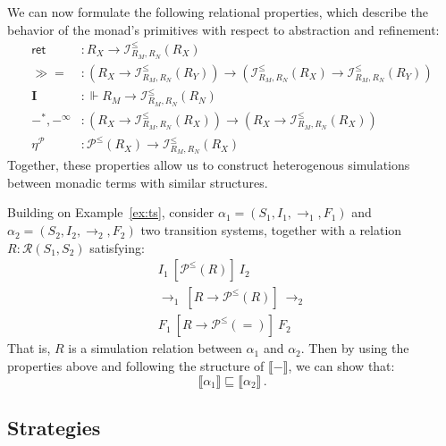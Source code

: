 \documentclass[acmsmall,timestamp,review,anonymous]{acmart}
\newcommand{\kw}[1]{\ensuremath{ \mathsf{#1} }}
\newcommand{\ifr}[1]{\ [{#1}]\ }
\newcommand{\bind}{\gg\!\!=}
\begin{document}
We can now formulate the following relational properties,
which describe the behavior of the monad's primitives
with respect to abstraction and refinement:
\begin{align*}
  \kw{ret} &:
    R_X \rightarrow \mathcal{I}^\le_{R_M,R_N}(R_X) \\
  \bind &:
    (R_X \rightarrow
     \mathcal{I}^\le_{R_M,R_N}(R_Y)) \rightarrow
    (\mathcal{I}^\le_{R_M,R_N}(R_X) \rightarrow
     \mathcal{I}^\le_{R_M,R_N}(R_Y)) \\
  \mathbf{I} &:
    {}\Vdash R_M \rightarrow
    \mathcal{I}^\le_{R_M,R_N}(R_N) \\
  -^*,
  -^\infty &:
    (R_X \rightarrow \mathcal{I}^\le_{R_M,R_N}(R_X)) \rightarrow
    (R_X \rightarrow \mathcal{I}^\le_{R_M,R_N}(R_X)) \\
  \eta^\mathcal{P} &:
    \mathcal{P}^\le(R_X) \rightarrow
    \mathcal{I}^\le_{R_M,R_N}(R_X)
\end{align*}
Together,
these properties allow us to construct
heterogenous simulations
between monadic terms with similar structures.

\begin{example} \label{ex:sim}
Building on Example~\ref{ex:ts},
consider
$\alpha_1 = (S_1, I_1, {\rightarrow}_1, F_1)$ and
$\alpha_2 = (S_2, I_2, {\rightarrow}_2, F_2)$
two transition systems,
together with a relation
$R : \mathcal{R}(S_1, S_2)$
satisfying:
\begin{gather*}
  I_1 \ifr{\mathcal{P}^\le(R)} I_2 \\
  {\rightarrow}_1 \ifr{R \rightarrow \mathcal{P}^\le(R)} {\rightarrow}_2 \\
  F_1 \ifr{R \rightarrow \mathcal{P}^\le(=)} F_2
\end{gather*}
That is, $R$ is a simulation relation between $\alpha_1$ and $\alpha_2$.
Then by using the properties above and
following the structure of $\llbracket - \rrbracket$,
we can show that:
\[
    \llbracket \alpha_1 \rrbracket \sqsubseteq
    \llbracket \alpha_2 \rrbracket \,.
\]
\end{example}


\subsection{Strategies} \label{sec:monad:games} %
\end{document}
